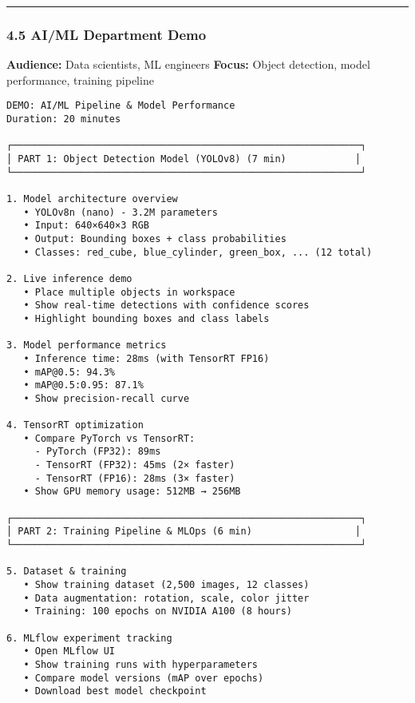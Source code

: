 \documentclass[
]{article}
\begin{document}
\begin{center}\rule{0.5\linewidth}{0.5pt}\end{center}

\hypertarget{aiml-department-demo}{%
\subsubsection{4.5 AI/ML Department Demo}\label{aiml-department-demo}}

\textbf{Audience:} Data scientists, ML engineers \textbf{Focus:} Object
detection, model performance, training pipeline

\begin{verbatim}
DEMO: AI/ML Pipeline & Model Performance
Duration: 20 minutes

┌─────────────────────────────────────────────────────────────┐
│ PART 1: Object Detection Model (YOLOv8) (7 min)            │
└─────────────────────────────────────────────────────────────┘

1. Model architecture overview
   • YOLOv8n (nano) - 3.2M parameters
   • Input: 640×640×3 RGB
   • Output: Bounding boxes + class probabilities
   • Classes: red_cube, blue_cylinder, green_box, ... (12 total)

2. Live inference demo
   • Place multiple objects in workspace
   • Show real-time detections with confidence scores
   • Highlight bounding boxes and class labels

3. Model performance metrics
   • Inference time: 28ms (with TensorRT FP16)
   • mAP@0.5: 94.3%
   • mAP@0.5:0.95: 87.1%
   • Show precision-recall curve

4. TensorRT optimization
   • Compare PyTorch vs TensorRT:
     - PyTorch (FP32): 89ms
     - TensorRT (FP32): 45ms (2× faster)
     - TensorRT (FP16): 28ms (3× faster)
   • Show GPU memory usage: 512MB → 256MB

┌─────────────────────────────────────────────────────────────┐
│ PART 2: Training Pipeline & MLOps (6 min)                  │
└─────────────────────────────────────────────────────────────┘

5. Dataset & training
   • Show training dataset (2,500 images, 12 classes)
   • Data augmentation: rotation, scale, color jitter
   • Training: 100 epochs on NVIDIA A100 (8 hours)

6. MLflow experiment tracking
   • Open MLflow UI
   • Show training runs with hyperparameters
   • Compare model versions (mAP over epochs)
   • Download best model checkpoint


\end{verbatim}
\end{document}
